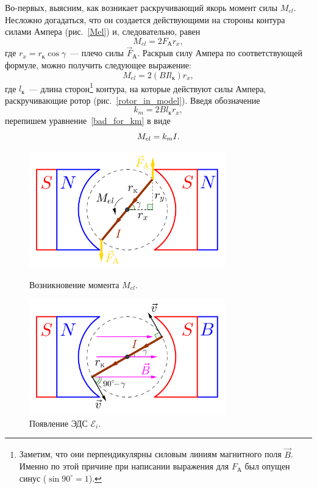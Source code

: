 \documentclass[12pt, a4paper, openany]{extarticle}
\begin{document}
Во-первых,  выясним, как возникает раскручивающий якорь момент силы $M_{el}$.
Несложно догадаться, что он создается действующими на стороны контура силами Ампера (рис.~\ref{Mel}) и, следовательно, равен
\begin{equation}
	M_{el} = 2F_\text{А}r_x,
\end{equation}   
где $r_x=r_\text{к}\cos\gamma$~--- плечо силы $\vec F_\text{А}$.
Раскрыв силу Ампера по соответствующей формуле, можно получить следующее выражение:
\begin{equation}\label{bad_for_km}
	M_{el} = 2(BIl_\text{к})r_x,
\end{equation}
где $l_\text{к}$~--- длина сторон\footnote{Заметим, что они перпендикулярны силовым линиям магнитного поля $\vec B$. Именно по этой причине при написании выражения для $F_\text{А}$ был опущен синус ($\sin 90^\circ = 1$).} контура, на которые действуют силы Ампера, раскручивающие ротор (рис.~\ref{rotor_in_model}).
Введя обозначение 
\begin{equation}\label{constr_const_km}
	k_m = 2Bl_\text{к}r_x,
\end{equation}
перепишем уравнение~\eqref{bad_for_km} в виде
\begin{equation}\label{for_km}
	M_{el} = k_mI\ldotp
\end{equation}

\begin{figure}[h]
	\begin{center}
		\begin{minipage}[h]{0.49\linewidth}
			\centering\includegraphics[height=5cm]{pics/Mel.png}
			\caption{Возникновение момента $M_{el}$.}
			\label{Mel} 
		\end{minipage}
		\hfill 
		\begin{minipage}[h]{0.49\linewidth}
			\centering\includegraphics[height=5cm]{pics/Ei.png}
			\caption{Появление ЭДС $\mathcal E_i$.}
			\label{Ei}
		\end{minipage}
	\end{center}
\end{figure}
\end{document}

